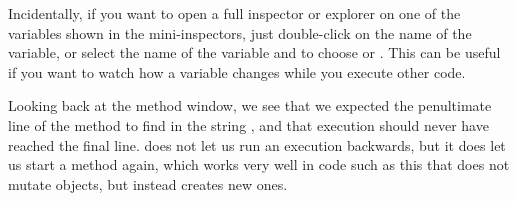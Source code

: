 \documentclass[a4paper,10pt,twoside]{book}
\begin{document}

Incidentally, if you want to open a full inspector or explorer on one of the variables shown in the mini-inspectors, just double-click on the name of the variable, or select the name of the variable and \actclick to choose  or .
This can be useful if you want to watch how a variable changes while you execute other code. 

Looking back at the method window, we see that we expected the penultimate line of the method to find  in the string , and that execution should never have reached the final line.
\pharo does not let us run an execution backwards, but it does let us start a method again, which works very well in code such as this that does not mutate objects, but instead creates new ones.  

\end{document}
